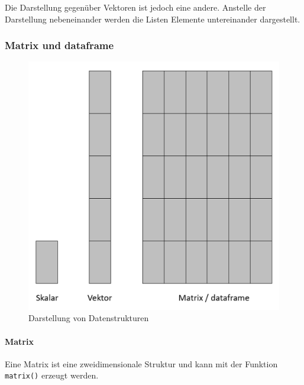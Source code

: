 \documentclass[
]{article}
\begin{document}
Die Darstellung gegenüber Vektoren ist jedoch eine andere. Anstelle der Darstellung nebeneinander werden die Listen Elemente untereinander dargestellt.

\hypertarget{matrix-und-dataframe}{%
\subsubsection{Matrix und dataframe}\label{matrix-und-dataframe}}

\begin{figure}

{\centering \includegraphics[width=9.83in]{images/020} 

}

\caption{Darstellung von Datenstrukturen}\label{fig:unnamed-chunk-65}
\end{figure}

\hypertarget{matrix}{%
\paragraph{Matrix}\label{matrix}}

Eine Matrix ist eine zweidimensionale Struktur und kann mit der Funktion \texttt{matrix()} erzeugt werden.
\end{document}
